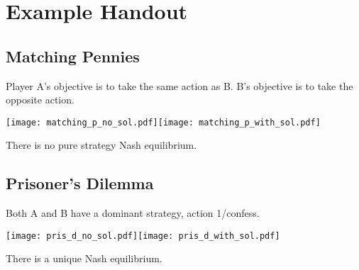 \documentclass[12pt,notitlepage]{article}
\begin{document}
\section*{Example Handout}

\subsection*{Matching Pennies}

Player A's objective is to take the same action as B. B's objective is to take the opposite action.

\begin{center}
\texttt{[image: matching\_p\_no\_sol.pdf]}\texttt{[image: matching\_p\_with\_sol.pdf]}
\end{center}

There is no pure strategy Nash equilibrium. 

\subsection*{Prisoner's Dilemma}

Both A and B have a dominant strategy, action 1/confess. 

\begin{center}
\texttt{[image: pris\_d\_no\_sol.pdf]}\texttt{[image: pris\_d\_with\_sol.pdf]}
\end{center}

There is a unique Nash equilibrium. 
\end{document}
